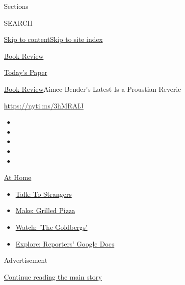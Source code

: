 Sections

SEARCH

\protect\hyperlink{site-content}{Skip to
content}\protect\hyperlink{site-index}{Skip to site index}

\href{https://www.nytimes.com/section/books/review}{Book Review}

\href{https://myaccount.nytimes.com/auth/login?response_type=cookie\&client_id=vi}{}

\href{https://www.nytimes.com/section/todayspaper}{Today's Paper}

\href{/section/books/review}{Book Review}\textbar{}Aimee Bender's Latest
Is a Proustian Reverie

\url{https://nyti.ms/3hMRAIJ}

\begin{itemize}
\item
\item
\item
\item
\item
\end{itemize}

\href{https://www.nytimes.com/spotlight/at-home?action=click\&pgtype=Article\&state=default\&region=TOP_BANNER\&context=at_home_menu}{At
Home}

\begin{itemize}
\tightlist
\item
  \href{https://www.nytimes.com/2020/08/03/well/family/the-benefits-of-talking-to-strangers.html?action=click\&pgtype=Article\&state=default\&region=TOP_BANNER\&context=at_home_menu}{Talk:
  To Strangers}
\item
  \href{https://www.nytimes.com/2020/08/01/at-home/coronavirus-make-pizza-on-a-grill.html?action=click\&pgtype=Article\&state=default\&region=TOP_BANNER\&context=at_home_menu}{Make:
  Grilled Pizza}
\item
  \href{https://www.nytimes.com/2020/07/31/arts/television/goldbergs-abc-stream.html?action=click\&pgtype=Article\&state=default\&region=TOP_BANNER\&context=at_home_menu}{Watch:
  'The Goldbergs'}
\item
  \href{https://www.nytimes.com/interactive/2020/at-home/even-more-reporters-editors-diaries-lists-recommendations.html?action=click\&pgtype=Article\&state=default\&region=TOP_BANNER\&context=at_home_menu}{Explore:
  Reporters' Google Docs}
\end{itemize}

Advertisement

\protect\hyperlink{after-top}{Continue reading the main story}

